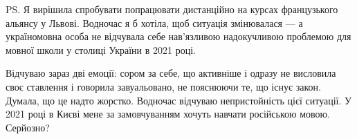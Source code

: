 PS. Я вирішила спробувати попрацювати дистанційно на курсах французького
альянсу у Львові. Водночас я б хотіла, щоб ситуація змінювалася — а
україномовна особа не відчувала себе нав’язливою надокучливою проблемою для
мовної школи у столиці України в 2021 році. 

Відчуваю зараз дві емоції: сором за себе, що активніше і одразу не висловила
своє ставлення і говорила завуальовано, не пояснюючи те, що існує закон.
Думала, що це надто жорстко. Водночас відчуваю непристойність цієї ситуації. У
2021 році в Києві мене за замовчуванням хочуть навчати російською мовою.
Серйозно?

